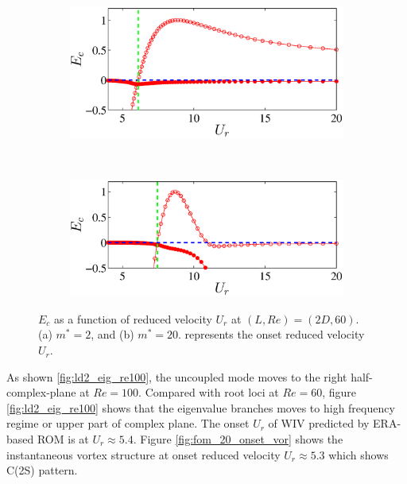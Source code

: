 \begin{figure}
\centering 
\begin{subfigure}{0.495\textwidth}
\centering
  \includegraphics[scale=0.45]{Ec_re60_mstar2}
    \caption{}
    \label{fig:Ec_m2}
    \end{subfigure}  \\
\begin{subfigure}{0.495\textwidth}
\centering
  \includegraphics[scale=0.45]{Ec_re60_mstar20}
    \caption{}
    \label{fig:Ec_m20}
    \end{subfigure} 
  \caption{$E_c$ as a function of reduced velocity $U_r$ at $(L,Re)=(2D,60)$.
  (a) $m^*=2$, and (b) $m^*=20$. {\protect\greendash} represents the onset reduced velocity $U_r$.}
\label{fig:energy}  
\end{figure}


As shown \ref{fig:ld2_eig_re100}, the uncoupled mode moves to the right half-complex-plane at $Re=100$. 
Compared with root loci at $Re=60$, figure \ref{fig:ld2_eig_re100} shows that the eigenvalue branches 
moves to high frequency regime or upper part of complex plane. The onset $U_r$ of WIV predicted by ERA-based ROM 
is at $U_r \approx 5.4$.  
Figure \ref{fig:fom_20_onset_vor} shows the instantaneous vortex structure at onset reduced velocity $U_r \approx 5.3$
which shows C(2S) pattern. 



